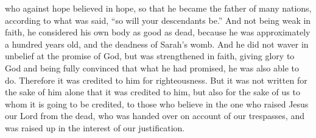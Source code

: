 \begin{biblechapter}
\verse who against hope believed in hope, so that he became the father of many nations, according to what was said, “so will your descendants be.”
\verse And not being weak in faith, he considered his own body as good as dead,  because he was approximately a hundred years old, and the deadness of Sarah’s womb.
\verse And he did not waver in unbelief at the promise of God, but was strengthened in faith, giving glory to God
\verse and being fully convinced that what he had promised, he was also able to do.
\verse Therefore it was credited to him for righteousness.
\verse But it was not written for the sake of him alone that it was credited to him,
\verse but also for the sake of us to whom it is going to be credited, to those who believe in the one who raised Jesus our Lord from the dead,
\verse who was handed over on account of our trespasses, and was raised up in the interest of our justification.
\end{biblechapter}

